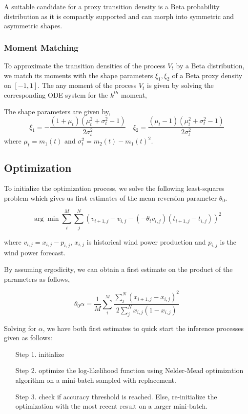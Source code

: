\documentclass[10pt,twocolumn,letterpaper]{article}
\begin{document}
 A suitable candidate for a proxy transition density is a Beta probability distribution as it is compactly supported and can morph into symmetric and asymmetric shapes.

\subsubsection*{ Moment Matching}
To approximate the transition densities of  the process $V_t$ by a Beta distribution, we match its moments with the shape parameters $\xi_1, \xi_2$ of a Beta proxy density on $[-1,1]$. The any moment of the process $V_t$ is  given by solving the corresponding ODE system  for the $k^{th}$  moment,

The shape parameters are given by,
\begin{equation}
\xi_1 = - \frac{(1+\mu_t )(\mu_t^2 + \sigma_t^2 -1)}{2 \sigma_t^2} \quad \xi_2=  \frac{(\mu_t-1 )(\mu_t^2 + \sigma_t^2 -1)}{2 \sigma_t^2} \label{param_transformed_beta}
\end{equation}
where $\mu_t = m_1 (t)$ and $\sigma_t^2= m_2 (t)- m_1 (t)^2$.

\subsection{Optimization}

To initialize the optimization process, we solve the following least-squares problem which gives us first estimates of the mean reversion parameter $\theta_0$. 

\begin{equation}
 \arg\min \sum\limits_{i}^M \sum\limits_j^N \left( v_{i+1,j}  - v_{i,j}- \left( - \theta_t v_{i,j}\right) \left(t_{i+1,j} - t_{i,j} \right)  \right)^2 
 \end{equation}
 
 where $v_{i,j}=x_{i,j}-p_{i,j}$,  $x_{i,j}$ is historical wind power production and $p_{i,j}$ is the wind power forecast.
 
 By assuming ergodicity, we can obtain a first estimate on the product of the parameters as follows,
 
\begin{equation}
\theta_0 \alpha = \frac{1}{M} \sum\limits_i^M \frac{ \sum\limits_j^N (x_{i+1,j}  - x_{i,j})^2}{2 \sum\limits_j^N x_{i,j}(1-x_{i,j}) }
\end{equation}

Solving for $\alpha$, we have both first estimates to quick start the inference processes given as follows:
\begin{enumerate}
\item[Step 1.]  initialize
\item[Step 2.]  optimize the log-likelihood function using  Nelder-Mead optimization algorithm on a mini-batch sampled with replacement.
\item[Step 3. ] check if  accuracy threshold is reached. Else, re-initialize the optimization with the most recent result on a larger mini-batch.
\end{enumerate}
\end{document}
